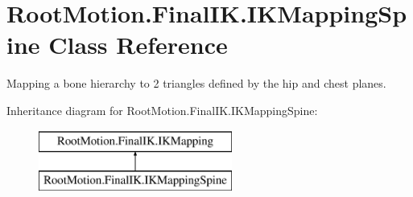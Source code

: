 \hypertarget{class_root_motion_1_1_final_i_k_1_1_i_k_mapping_spine}{}\section{Root\+Motion.\+Final\+I\+K.\+I\+K\+Mapping\+Spine Class Reference}
\label{class_root_motion_1_1_final_i_k_1_1_i_k_mapping_spine}


Mapping a bone hierarchy to 2 triangles defined by the hip and chest planes.  


Inheritance diagram for Root\+Motion.\+Final\+I\+K.\+I\+K\+Mapping\+Spine\+:\begin{figure}[H]
\begin{center}
\leavevmode
\includegraphics[height=2.000000cm]{class_root_motion_1_1_final_i_k_1_1_i_k_mapping_spine}
\end{center}
\end{figure}
